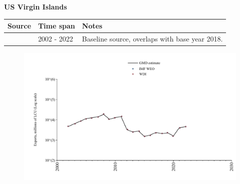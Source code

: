 \documentclass[12pt,a4paper,landscape]{article}
\begin{document}
\begin{adjustbox}{max totalsize={\paperwidth}{\paperheight},center}
\begin{minipage}[t][\textheight][t]{\textwidth}
\vspace*{0.5cm}
{}
\begin{center}
{\Large\bfseries US Virgin Islands}
\end{center}
\vspace{0.5cm}
\begin{table}[H]
\centering
\small
\begin{tabular}{|l|l|l|}
\hline
\textbf{Source} & \textbf{Time span} & \textbf{Notes} \\
\hline
\rowcolor{white}\cite{WDI}& 2002 - 2022 &Baseline source, overlaps with base year 2018.\\
\hline
\end{tabular}
\end{table}
\begin{figure}[H]
\centering
\includegraphics[width=\textwidth,height=0.6\textheight,keepaspectratio]{graphs/VIR_exports.pdf}
\end{figure}
\end{minipage}
\end{adjustbox}
\end{document}
